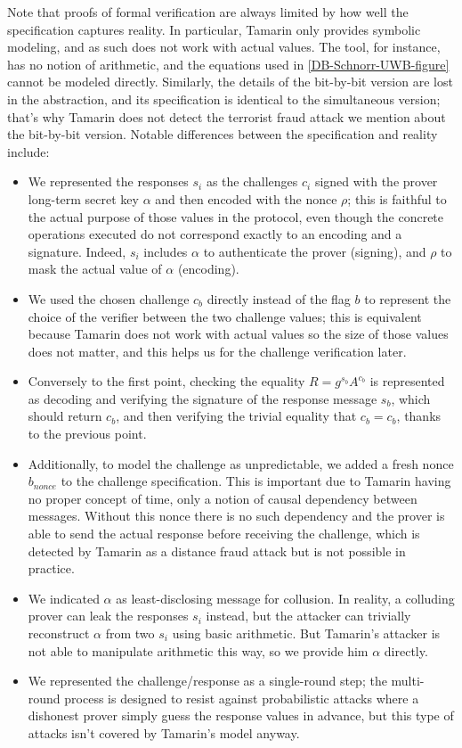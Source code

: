 Note that proofs of formal verification are always limited by how well the specification captures reality.
In particular, Tamarin only provides symbolic modeling, and as such does not 
work with actual values. The tool, for instance, has no notion of arithmetic, 
and the equations used in \cref{DB-Schnorr-UWB-figure} cannot be modeled 
directly. Similarly, the details of the bit-by-bit version are lost in the 
abstraction, and its specification is identical to the simultaneous version; 
that's why Tamarin does not detect the terrorist fraud attack we mention about 
the bit-by-bit version.
Notable differences between the specification and reality include:
\begin{itemize}
	\item We represented the responses $s_i$ as the challenges $c_i$ signed with the prover long-term secret key $\alpha$ and then encoded with the nonce $\rho$; this is faithful to the actual purpose of those values in the protocol, even though the concrete operations executed do not correspond exactly to an encoding and a signature. Indeed, $s_i$ includes $\alpha$ to authenticate the prover (signing), and $\rho$ to mask the actual value of $\alpha$ (encoding).
	\item We used the chosen challenge $c_b$ directly instead of the flag $b$ to represent the choice of the verifier between the two challenge values; this is equivalent because Tamarin does not work with actual values so the size of those values does not matter, and this helps us for the challenge verification later.
  \item Conversely to the first point, checking the equality $R = g^{s_b} 
    A^{c_b}$ is represented as decoding and verifying the signature of the 
    response message $s_b$, which should return $c_b$, and then verifying the 
    trivial equality that $c_b = c_b$, thanks to the previous point.
	\item Additionally, to model the challenge as unpredictable, we added a fresh nonce $b_{nonce}$ to the challenge specification. This is important due to Tamarin having no proper concept of time, only a notion of causal dependency between messages. Without this nonce there is no such dependency and the prover is able to send the actual response before receiving the challenge, which is detected by Tamarin as a distance fraud attack but is not possible in practice.
	\item We indicated $\alpha$ as least-disclosing message for collusion. In reality, a colluding prover can leak the responses $s_i$ instead, but the attacker can trivially reconstruct $\alpha$ from two $s_i$ using basic arithmetic. But Tamarin's attacker is not able to manipulate arithmetic this way, so we provide him $\alpha$ directly.
	\item We represented the challenge/response as a single-round step; the multi-round process is designed to resist against probabilistic attacks where a dishonest prover simply guess the response values in advance, but this type of attacks isn't covered by Tamarin's model anyway.
\end{itemize}



